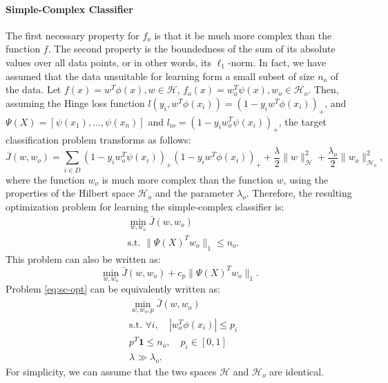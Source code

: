 	\paragraph{Simple-Complex Classifier}
	The first necessary property for $f_o$ is that it be much more complex than the function $f$. The second property is the boundedness of the sum of its absolute values over all data points, or in other words, its $\ell_1$-norm. In fact, we have assumed that the data unsuitable for learning form a small subset of size $n_o$ of the data. Let $f(x) = w^T \phi(x), w \in \mathcal{H}$, $f_o(x) = w_o^T \psi(x), w_o \in \mathcal{H}_o$. Then, assuming the Hinge loss function $l(y_i, w^T\phi(x_i)) = (1 - y_i w^T\phi(x_i))_+$, and $\Psi(X) = [\psi(x_1), \ldots, \psi(x_n)]$ and $l_{io} = (1 - y_i w_o^T \psi(x_i))_+$, the target classification problem transforms as follows:
	\begin{equation}
		\label{eq:sc-obj}
		\bar{J}(w, w_o) = \sum_{i \in D} (1 - y_i w_o^T \psi(x_i))_+ (1 - y_i w^T \phi(x_i))_+ + \frac{\lambda}{2}\|w\|^2_{\mathcal{H}} + \frac{\lambda_o}{2}\|w_o\|^2_{\mathcal{H}_o},
	\end{equation}
	where the function $w_o$ is much more complex than the function $w$, using the properties of the Hilbert space $\mathcal{H}_o$ and the parameter $\lambda_o$. Therefore, the resulting optimization problem for learning the simple-complex classifier is:
	\begin{subequations}
		\label{eq:sc-opt}
		\begin{align}
			&\min_{w, w_o} \bar{J}(w, w_o) \\
			&\text{s.t. } \|\Psi(X)^T w_o\|_1 \le n_o.
		\end{align}
	\end{subequations}
	This problem can also be written as:
	\begin{equation}
		\min_{w, w_o} \bar{J}(w, w_o) + c_p \|\Psi(X)^T w_o\|_1.
	\end{equation}
	Problem \eqref{eq:sc-opt} can be equivalently written as:
	\begin{subequations}
		\label{eq:sc-opt-equivalent}
		\begin{align}
			&\min_{w, w_o, p} \bar{J}(w, w_o) \\
			&\text{s.t. } \forall i, \quad |w_o^T \phi(x_i)| \le p_i \\
			&p^T \mathbf{1} \le n_o, \quad p_i \in [0, 1] \\
			&\lambda \gg \lambda_o.
		\end{align}
	\end{subequations}
	For simplicity, we can assume that the two spaces $\mathcal{H}$ and $\mathcal{H}_o$ are identical.
	
